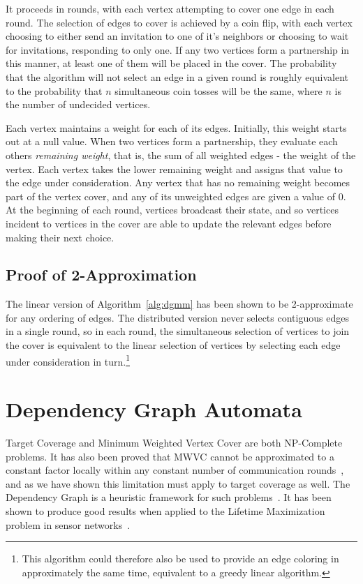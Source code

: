 It proceeds in rounds, with each vertex attempting to cover one edge in each round. The selection of edges to cover is achieved by a coin flip, with each vertex choosing to either send an invitation to one of it's neighbors or choosing to wait for invitations, responding to only one. If any two vertices form a partnership in this manner, at least one of them will be placed in the cover. The probability that the algorithm will not select an edge in a given round is roughly equivalent to the probability that $n$ simultaneous coin tosses will be the same, where $n$ is the number of undecided vertices.

Each vertex maintains a weight for each of its edges. Initially, this weight starts out at a null value. When two vertices form a partnership, they evaluate each others {\em remaining weight}, that is, the sum of all weighted edges - the weight of the vertex. Each vertex takes the lower remaining weight and assigns that value to the edge under consideration. Any vertex that has no remaining weight becomes part of the vertex cover, and any of its unweighted edges are given a value of 0. At the beginning of each round, vertices broadcast their state, and so vertices incident to vertices in the cover are able to update the relevant edges before making their next choice.



\subsection{Proof of 2-Approximation}
The linear version of Algorithm~\ref{alg:dgmm} has been shown to be 2-approximate for any ordering of edges. The distributed version never selects contiguous edges in a single round, so in each round, the simultaneous selection of vertices to join the cover is equivalent to the linear selection of vertices by selecting each edge under consideration in turn.\footnote{This algorithm could therefore also be used to provide an edge coloring in approximately the same time, equivalent to a greedy linear algorithm.}

\section{Dependency Graph Automata}
\label{sec:life-depend}
Target Coverage and Minimum Weighted Vertex Cover are both NP-Complete problems. It has also been proved that MWVC cannot be approximated to a constant factor locally within any constant number of communication rounds~\cite{1011811}, and as we have shown this limitation must apply to target coverage as well. The Dependency Graph is a heuristic framework for such problems~\cite{IPDPS.2008.45361}. It has been shown to produce good results when applied to the Lifetime Maximization problem in sensor networks~\cite{978-3-540-89894-8_26}.


